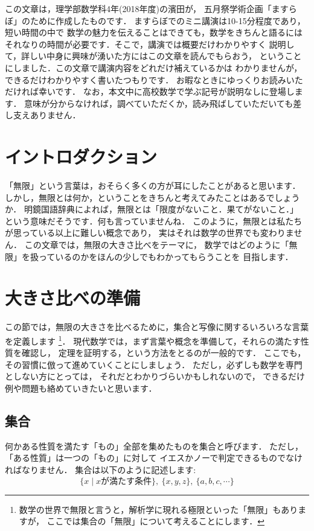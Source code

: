 \documentclass[./main]{subfiles} %
\theoremstyle{definition}
\begin{document}

この文章は，理学部数学科4年(2018年度)の濱田が，
五月祭学術企画「ますらぼ」のために作成したものです．
ますらぼでのミニ講演は10-15分程度であり，短い時間の中で
数学の魅力を伝えることはできても，数学をきちんと語るには
それなりの時間が必要です．そこで，講演では概要だけわかりやすく
説明して，詳しい中身に興味が湧いた方にはこの文章を読んでもらおう，
ということにしました．この文章で講演内容をどれだけ補えているかは
わかりませんが，できるだけわかりやすく書いたつもりです．
お暇なときにゆっくりお読みいただければ幸いです．
なお，本文中に高校数学で学ぶ記号が説明なしに登場します．
意味が分からなければ，調べていただくか，読み飛ばしていただいても差し支えありません．

\section{イントロダクション}
「無限」という言葉は，おそらく多くの方が耳にしたことがあると思います．
しかし，無限とは何か，ということをきちんと考えてみたことはあるでしょうか．
明鏡国語辞典によれば，無限とは「限度がないこと．果てがないこと．」
という意味だそうです．何も言っていませんね．
このように，無限とは私たちが思っている以上に難しい概念であり，
実はそれは数学の世界でも変わりません．
この文章では，無限の大きさ比べをテーマに，
数学ではどのように「無限」を扱っているのかをほんの少しでもわかってもらうことを
目指します．

\section{大きさ比べの準備}
この節では，無限の大きさを比べるために，集合と写像に関するいろいろな言葉を定義します
\footnote{数学の世界で無限と言うと，解析学に現れる極限といった「無限」もありますが，
ここでは集合の「無限」について考えることにします．}．
現代数学では，まず言葉や概念を準備して，それらの満たす性質を確認し，
定理を証明する，という方法をとるのが一般的です．
ここでも，その習慣に倣って進めていくことにしましょう．
ただし，必ずしも数学を専門としない方にとっては，
それだとわかりづらいかもしれないので，
できるだけ例や問題も絡めていきたいと思います．

\subsection{集合}
何かある性質を満たす「もの」全部を集めたものを集合と呼びます．
ただし，「ある性質」は一つの「もの」に対して
イエスかノーで判定できるものでなければなりません．
集合は以下のように記述します:
\[
\{x\mid xが満たす条件\},\ \{x,y,z\},\ \{a,b,c,\cdots\}
\]
\end{document}
